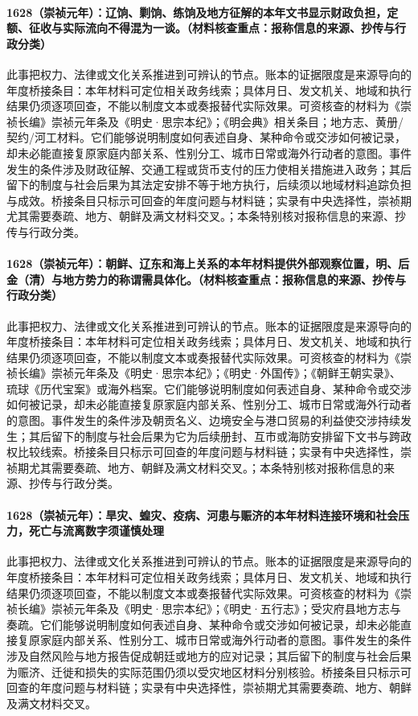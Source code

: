 \paragraph{1628（崇祯元年）：辽饷、剿饷、练饷及地方征解的本年文书显示财政负担，定额、征收与实际流向不得混为一谈。（材料核查重点：报称信息的来源、抄传与行政分类）} 此事把权力、法律或文化关系推进到可辨认的节点。账本的证据限度是来源导向的年度桥接条目：本年材料可定位相关政务线索；具体月日、发文机关、地域和执行结果仍须逐项回查，不能以制度文本或奏报替代实际效果。可资核查的材料为《崇祯长编》崇祯元年条及《明史·思宗本纪》；《明会典》相关条目；地方志、黄册/契约/河工材料。它们能够说明制度如何表述自身、某种命令或交涉如何被记录，却未必能直接复原家庭内部关系、性别分工、城市日常或海外行动者的意图。事件发生的条件涉及财政征解、交通工程或货币支付的压力使相关措施进入政务；其后留下的制度与社会后果为其法定安排不等于地方执行，后续须以地域材料追踪负担与成效。桥接条目只标示可回查的年度问题与材料链；实录有中央选择性，崇祯期尤其需要奏疏、地方、朝鲜及满文材料交叉。；本条特别核对报称信息的来源、抄传与行政分类。

\paragraph{1628（崇祯元年）：朝鲜、辽东和海上关系的本年材料提供外部观察位置，明、后金（清）与地方势力的称谓需具体化。（材料核查重点：报称信息的来源、抄传与行政分类）} 此事把权力、法律或文化关系推进到可辨认的节点。账本的证据限度是来源导向的年度桥接条目：本年材料可定位相关政务线索；具体月日、发文机关、地域和执行结果仍须逐项回查，不能以制度文本或奏报替代实际效果。可资核查的材料为《崇祯长编》崇祯元年条及《明史·思宗本纪》；《明史·外国传》；《朝鲜王朝实录》、琉球《历代宝案》或海外档案。它们能够说明制度如何表述自身、某种命令或交涉如何被记录，却未必能直接复原家庭内部关系、性别分工、城市日常或海外行动者的意图。事件发生的条件涉及朝贡名义、边境安全与港口贸易的利益使交涉持续发生；其后留下的制度与社会后果为它为后续册封、互市或海防安排留下文书与跨政权比较线索。桥接条目只标示可回查的年度问题与材料链；实录有中央选择性，崇祯期尤其需要奏疏、地方、朝鲜及满文材料交叉。；本条特别核对报称信息的来源、抄传与行政分类。

\paragraph{1628（崇祯元年）：旱灾、蝗灾、疫病、河患与赈济的本年材料连接环境和社会压力，死亡与流离数字须谨慎处理} 此事把权力、法律或文化关系推进到可辨认的节点。账本的证据限度是来源导向的年度桥接条目：本年材料可定位相关政务线索；具体月日、发文机关、地域和执行结果仍须逐项回查，不能以制度文本或奏报替代实际效果。可资核查的材料为《崇祯长编》崇祯元年条及《明史·思宗本纪》；《明史·五行志》；受灾府县地方志与奏疏。它们能够说明制度如何表述自身、某种命令或交涉如何被记录，却未必能直接复原家庭内部关系、性别分工、城市日常或海外行动者的意图。事件发生的条件涉及自然风险与地方报告促成朝廷或地方的应对记录；其后留下的制度与社会后果为赈济、迁徙和损失的实际范围仍须以受灾地区材料分别核验。桥接条目只标示可回查的年度问题与材料链；实录有中央选择性，崇祯期尤其需要奏疏、地方、朝鲜及满文材料交叉。

